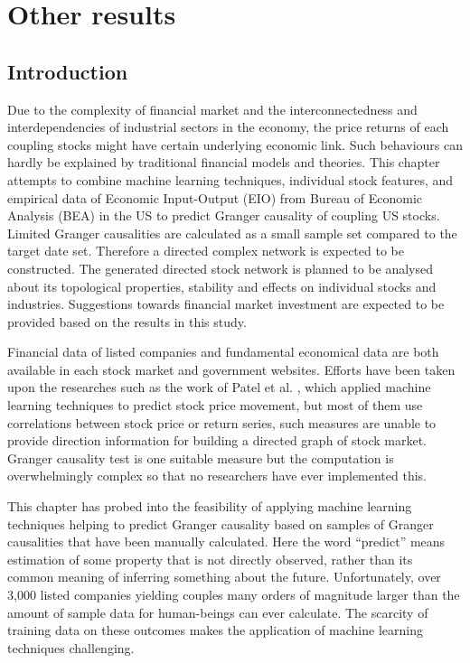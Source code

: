 \chapter{Other results}
\label{cpt:other}
\section{Introduction}
Due to the complexity of financial market and the interconnectedness and interdependencies of industrial sectors in the economy, the price returns of each coupling stocks might have certain underlying economic link. Such behaviours can hardly be explained by traditional financial models and theories. This chapter attempts to combine machine learning techniques, individual stock features, and empirical data of Economic Input-Output (EIO) from Bureau of Economic Analysis (BEA) in the US to predict Granger causality of coupling US stocks. Limited Granger causalities are calculated as a small sample set compared to the target date set. Therefore a directed complex network is expected to be constructed. The generated directed stock network is planned to be analysed about its topological properties, stability and effects on individual stocks and industries. Suggestions towards financial market investment are expected to be provided based on the results in this study.

Financial data of listed companies and fundamental economical data are both available in each stock market and government websites. Efforts have been taken upon the researches such as the work of Patel et al. \cite{patel2015predicting}, which applied machine learning techniques to predict stock price movement, but most of them use correlations between stock price or return series, such measures are unable to provide direction information for building a directed graph of stock market. Granger causality test is one suitable measure but the computation is overwhelmingly complex so that no researchers have ever implemented this.

This chapter has probed into the feasibility of applying machine learning techniques helping to predict Granger causality based on samples of Granger causalities that have been manually calculated. Here the word “predict” means estimation of some property that is not directly observed, rather than its common meaning of inferring something about the future. Unfortunately, over 3,000 listed companies yielding couples many orders of magnitude larger than the amount of sample data for human-beings can ever calculate. The scarcity of training data on these outcomes makes the application of machine learning techniques challenging.

